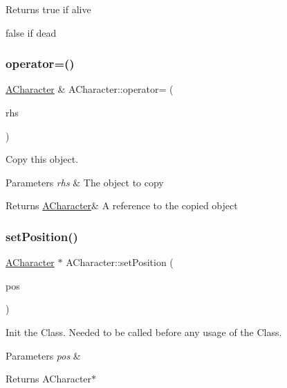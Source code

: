 \begin{DoxyReturn}{Returns}
true if alive 

false if dead 
\end{DoxyReturn}
\mbox{\label{class_a_character_ad38be256f14ea4844adbcf4643837994}} 
\subsubsection{\texorpdfstring{operator=()}{operator=()}}
{\footnotesize\ttfamily \hyperlink{class_a_character}{A\+Character} \& A\+Character\+::operator= (\begin{DoxyParamCaption}\item[{\hyperlink{class_a_character}{A\+Character} const \&}]{rhs }\end{DoxyParamCaption})}



Copy this object. 


\begin{DoxyParams}{Parameters}
{\em rhs} & The object to copy \\
\hline
\end{DoxyParams}
\begin{DoxyReturn}{Returns}
\hyperlink{class_a_character}{A\+Character}\& A reference to the copied object 
\end{DoxyReturn}
\mbox{\label{class_a_character_a7e110857fc1e545a907d1e083431044a}} 
\subsubsection{\texorpdfstring{set\+Position()}{setPosition()}}
{\footnotesize\ttfamily \hyperlink{class_a_character}{A\+Character} $\ast$ A\+Character\+::set\+Position (\begin{DoxyParamCaption}\item[{glm\+::vec3}]{pos }\end{DoxyParamCaption})}



Init the Class. Needed to be called before any usage of the Class. 


\begin{DoxyParams}{Parameters}
{\em pos} & \\
\hline
\end{DoxyParams}
\begin{DoxyReturn}{Returns}
A\+Character$\ast$ 
\end{DoxyReturn}
\mbox{\label{class_a_character_a1ab94580e4db621f79f0bf1d6bcdb600}} 

